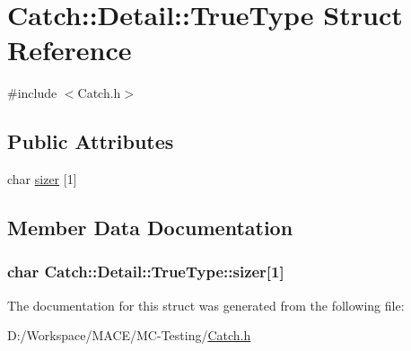 \hypertarget{struct_catch_1_1_detail_1_1_true_type}{}\section{Catch\+:\+:Detail\+:\+:True\+Type Struct Reference}
\label{struct_catch_1_1_detail_1_1_true_type}


{\ttfamily \#include $<$Catch.\+h$>$}

\subsection*{Public Attributes}
\begin{DoxyCompactItemize}
\item 
char \hyperlink{struct_catch_1_1_detail_1_1_true_type_a3aaaeb75909e668b293c8a81f5fb6419}{sizer} \mbox{[}1\mbox{]}
\end{DoxyCompactItemize}


\subsection{Member Data Documentation}
\subsubsection[{\texorpdfstring{sizer}{sizer}}]{\setlength{\rightskip}{0pt plus 5cm}char Catch\+::\+Detail\+::\+True\+Type\+::sizer\mbox{[}1\mbox{]}}\hypertarget{struct_catch_1_1_detail_1_1_true_type_a3aaaeb75909e668b293c8a81f5fb6419}{}\label{struct_catch_1_1_detail_1_1_true_type_a3aaaeb75909e668b293c8a81f5fb6419}


The documentation for this struct was generated from the following file\+:\begin{DoxyCompactItemize}
\item 
D\+:/\+Workspace/\+M\+A\+C\+E/\+M\+C-\/\+Testing/\hyperlink{_catch_8h}{Catch.\+h}\end{DoxyCompactItemize}
